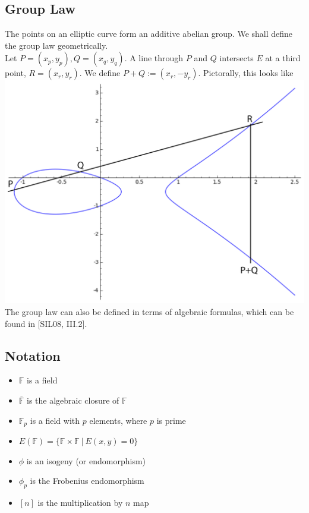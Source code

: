 \documentclass[12pt,twoside]{article}
\newcommand\given[1][]{\:#1\vert\:}
\begin{document}
\subsection{Group Law} 
The points on an elliptic curve form an additive abelian group. We shall define the group law geometrically. \\
Let $P = (x_p, y_p), Q = (x_q, y_q)$. A line through $P$ and $Q$ intersects $E$ at a third point, $R = (x_r,y_r)$. We define $P + Q := (x_r,-y_r)$. Pictorally, this looks like \\
\includegraphics[width=6in]{grouplaw.png}
The group law can also be defined in terms of algebraic formulas, which can be found in [SIL08, III.2].

\subsection{Notation}
\begin{itemize}
\item $\mathbb F$ is a field
\item $\overline{\mathbb F}$ is the algebraic closure of $\mathbb F$
\item $\mathbb F_p$ is a field with $p$ elements, where $p$ is prime
\item $E(\mathbb F) = \{\mathbb F \times \mathbb F \given E(x,y) = 0\}$
\item $\phi$ is an isogeny (or endomorphism)
\item $\phi_p$ is the Frobenius endomorphism
\item $[n]$ is the multiplication by $n$ map
\end{itemize}
\end{document}

